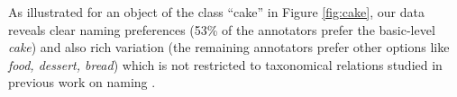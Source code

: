 As illustrated for an object of the class ``cake'' in Figure \ref{fig:cake}, our data reveals clear naming preferences (53\% of the annotators prefer the basic-level \textit{cake}) and also rich variation (the remaining annotators prefer other options like \textit{food, dessert, bread}) which is not restricted to taxonomical relations studied in previous work on naming \cite{Ordonez:2016,graf2016animal}.

